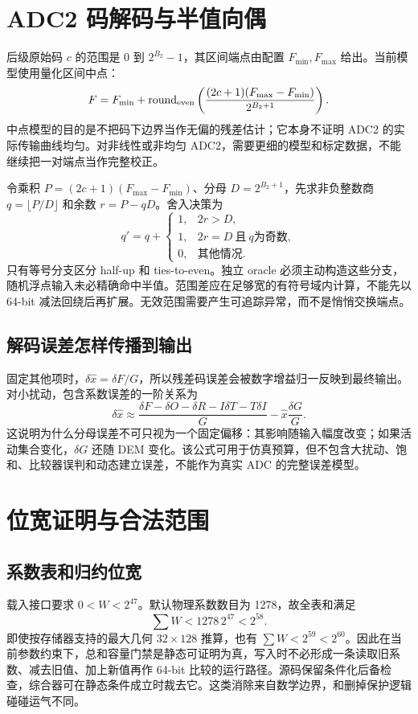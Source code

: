 \section{ADC2 码解码与半值向偶}
后级原始码 \(c\) 的范围是 \(0\) 到 \(2^{B_2}-1\)，其区间端点由配置 \(F_{\min},F_{\max}\) 给出。当前模型使用量化区间中点：
\begin{equation}
F=F_{\min}+\operatorname{round}_{\rm even}
\left(\frac{(2c+1)(F_{\max}-F_{\min})}{2^{B_2+1}}\right).
\end{equation}
中点模型的目的是不把码下边界当作无偏的残差估计；它本身不证明 ADC2 的实际传输曲线均匀。对非线性或非均匀 ADC2，需要更细的模型和标定数据，不能继续把一对端点当作完整校正。

令乘积 \(P=(2c+1)(F_{\max}-F_{\min})\)、分母 \(D=2^{B_2+1}\)，先求非负整数商 \(q=\lfloor P/D\rfloor\) 和余数 \(r=P-qD\)。舍入决策为
\begin{equation}
q'=q+\begin{cases}
1,&2r>D,\\
1,&2r=D\ \text{且}\ q\text{为奇数},\\
0,&\text{其他情况}.
\end{cases}
\end{equation}
只有等号分支区分 half-up 和 ties-to-even。独立 oracle 必须主动构造这些分支，随机浮点输入未必精确命中半值。范围差应在足够宽的有符号域内计算，不能先以 64-bit 减法回绕后再扩展。无效范围需要产生可追踪异常，而不是悄悄交换端点。

\subsection{解码误差怎样传播到输出}
固定其他项时，\(\delta\hat x=\delta F/G\)，所以残差码误差会被数字增益归一反映到最终输出。对小扰动，包含系数误差的一阶关系为
\begin{equation}
\delta\hat x\approx
\frac{\delta F-\delta O-\delta R-I\delta T-T\delta I}{G}
-\hat x\frac{\delta G}{G}.
\end{equation}
这说明为什么分母误差不可只视为一个固定偏移：其影响随输入幅度改变；如果活动集合变化，\(\delta G\) 还随 DEM 变化。该公式可用于仿真预算，但不包含大扰动、饱和、比较器误判和动态建立误差，不能作为真实 ADC 的完整误差模型。

\section{位宽证明与合法范围}
\subsection{系数表和归约位宽}
载入接口要求 \(0<W<2^{47}\)。默认物理系数数目为 1278，故全表和满足
\begin{equation}
\sum W<1278\,2^{47}<2^{58}.
\end{equation}
即使按存储器支持的最大几何 \(32\times128\) 推算，也有 \(\sum W<2^{59}<2^{60}\)。因此在当前参数约束下，总和容量门禁是静态可证明为真，写入时不必形成一条读取旧系数、减去旧值、加上新值再作 64-bit 比较的运行路径。源码保留条件化后备检查，综合器可在静态条件成立时裁去它。这类消除来自数学边界，和删掉保护逻辑碰碰运气不同。

